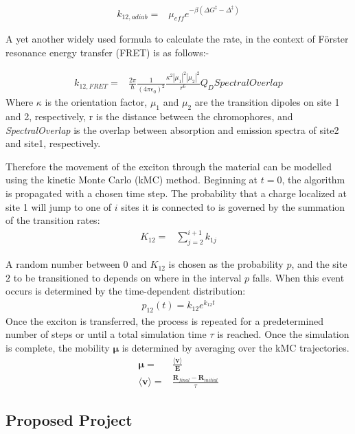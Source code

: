 \documentclass{article}
\begin{document}
\begin{align}
    k_{12,adiab}=&\mu_{eff}e^{-\beta(\Delta G^{\ddag}-\Delta^\ddag)}
\end{align}

A yet another widely used formula to calculate the rate, in the context of Förster resonance energy transfer (FRET) is as follows:-

\begin{align}
    k_{12,FRET}=&\frac{2\pi}{\hbar}\frac{1}{(4\pi\epsilon_0)^2} \frac{\kappa^2|\mu_1|^2|\mu_2|^2}{r^6}Q_DSpectralOverlap
\end{align}
Where $\kappa$ is the orientation factor, $\mu_1$ and $\mu_2$ are the transition dipoles on site 1 and 2, respectively, r is the distance between the chromophores, and \textit{SpectralOverlap} is the overlap between absorption and emission spectra of site2 and site1, respectively. 

Therefore the movement of the exciton through the material can be modelled using the kinetic Monte Carlo (kMC) method.\cite{Oberhofer2017ChargeMethods} Beginning at $t=0$, the algorithm is propagated with a chosen time step. The probability that a charge localized at site 1 will jump to one of $i$ sites it is connected to is governed by the summation of the transition rates:
\begin{align}
    K_{12}=&\sum_{j=2}^{i+1} k_{1j}
\end{align}

A random number between $0$ and $K_{12}$ is chosen as the probability $p$, and the site $2$ to be transitioned to depends on where in the interval $p$ falls. When this event occurs is determined by the time-dependent distribution:
\begin{align}
    p_{12}(t)=k_{12}e^{k_{12}t}
\end{align}
Once the exciton is transferred, the process is repeated for a predetermined number of steps or until a total simulation time $\tau$ is reached. 
Once the simulation is complete, the mobility $\mathbf{\mu}$ is determined by averaging over the kMC trajectories.
\begin{align}
    \mathbf{\mu}=&\frac{\langle \mathbf{v}\rangle}{\mathbf{E}}\\
    \langle\mathbf{v}\rangle=&\frac{\mathbf{R}_{final}-\mathbf{R}_{initial}}{\tau}
\end{align}


\subsection{Proposed Project}
\end{document}
